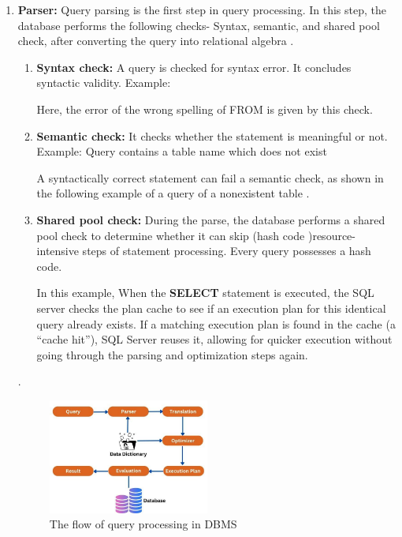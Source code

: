 \begin{enumerate}
\item \textbf{Parser:} Query parsing is the first step in query processing. In this step, the database performs the following checks- Syntax, semantic, and shared pool check, after converting the query into relational algebra \cite{wwwnaukricom-no-date}.

    \begin{enumerate}
        \item \textbf{Syntax check:} A query is checked for syntax error. It concludes syntactic validity. Example:
        
        
          Here, the error of the wrong spelling of FROM is given by this check.\vspace{.4cm}
          
        \item \textbf{Semantic check:} It checks whether the statement is meaningful or not. Example: Query contains a table name which does not exist
        
        
        
        A syntactically correct statement can fail a semantic check, as shown in the following example of a query of a nonexistent table \cite{Oracle}.\vspace{.4cm}
        
        \item \textbf{Shared pool check:} During the parse, the database performs a shared pool check to determine whether it can skip (hash code )resource-intensive steps of statement processing. Every query possesses a hash code.\vspace{.4cm}
        
        
        
        In this example, When the \textbf{SELECT} statement is executed, the SQL server checks the plan cache to see if an execution plan for this identical query already exists. If a matching execution plan is found in the cache (a ``cache hit''), SQL Server reuses it, allowing for quicker execution without going through the parsing and optimization steps again.
        
    \end{enumerate}.
    
\begin{figure}[h]
    \centering
    \includegraphics[width=0.5\textwidth]{Figure/Query processing.jpg}
    \caption[The flow of query processing in DBMS]{The flow of query processing in DBMS \cite{Oracle}}
    \label{fig:my_image}
\end{figure}
    

\end{enumerate}
